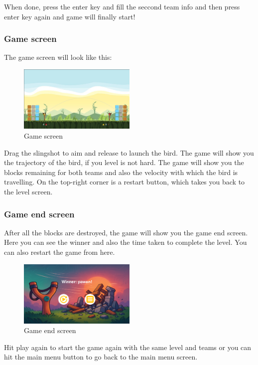 \documentclass[10pt]{article}
\begin{document}
When done, press the enter key and fill the seccond team info and then press enter key again and game will finally start!

\newpage
\subsubsection{Game screen}
The game screen will look like this:
\begin{figure}[h!]
    \centering
    \includegraphics[width=0.5\textwidth]{assets/instruction-images/image2.png}
    \caption{Game screen}
    \label{fig:game-screen}
\end{figure}
Drag the slingshot to aim and release to launch the bird. The game will show you the trajectory of the bird, if you level is not hard. 
The game will show you the blocks remaining for both teams and also the velocity with which the bird is travelling.
On the top-right corner is a restart button, which takes you back to the level screen.


\subsubsection{Game end screen}
After all the blocks are destroyed, the game will show you the game end screen.
Here you can see the winner and also the time taken to complete the level. You can also restart the game from here.
\begin{figure}[h!]
    \centering
    \includegraphics[width=0.5\textwidth]{assets/report_images/end_screen.png}
    \caption{Game end screen}
    \label{fig:game-end}
\end{figure}

Hit play again to start the game again with the same level and teams or you can hit the main menu button to go back to the main menu screen.
\end{document}
